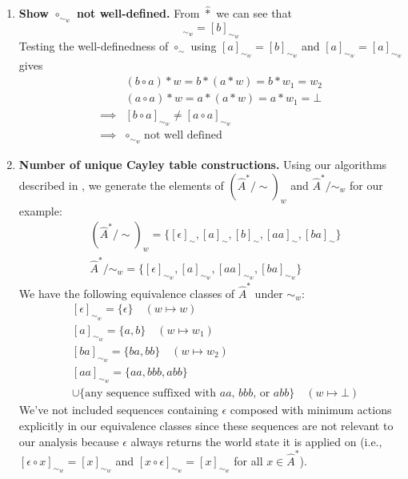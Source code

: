 \begin{proofE}
\begin{enumerate}
    \item \textbf{Show $\circ_{\sim_{w}}$ not well-defined.}
    From $\hat{\ast}$ we can see that
    \begin{equation}
        [a]_{\sim_{w}} = [b]_{\sim_{w}}
    \end{equation}
    Testing the well-definedness of $\circ_{\sim}$ using $[a]_{\sim_{w}} = [b]_{\sim_{w}}$ and $[a]_{\sim_{w}} = [a]_{\sim_{w}}$ gives
    \begin{align}
        & (b \circ a) \ast w = b \ast (a \ast w) = b \ast w_{1} = w_{2} \\
        & (a \circ a) \ast w = a \ast (a \ast w) = a \ast w_{1} = \bot \\
        \implies & [b \circ a]_{\sim_{w}} \neq [a \circ a]_{\sim_{w}} \\
        \implies & \circ_{\sim_{w}} \; \text{not well defined}
    \end{align}

    \item \textbf{Number of unique Cayley table constructions.}
    Using our algorithms described in , we generate the elements of $(\hat{A}^{*}/\sim)_{w}$ and $\hat{A}^{*}/\sim_{w}$ for our example:
    \begin{align}
        & (\hat{A}^{*}/\sim)_{w} = \{ [\epsilon]_{\sim}, [a]_{\sim}, [b]_{\sim}, [aa]_{\sim}, [ba]_{\sim} \} \\
        & \hat{A}^{*}/\sim_{w} = \{ [\epsilon]_{\sim_{w}}, [a]_{\sim_{w}}, [aa]_{\sim_{w}}, [ba]_{\sim_{w}} \}
    \end{align}
    We have the following equivalence classes of $\hat{A}^{*}$ under $\sim_{w}$:
    \begin{align}
        & [\epsilon]_{\sim_{w}} = \{ \epsilon \} \quad (w \mapsto w) \\
        & [a]_{\sim_{w}} = \{ a, b \} \quad (w \mapsto w_{1}) \\
        & [ba]_{\sim_{w}} = \{ ba, bb \} \quad (w \mapsto w_{2}) \\
        & [aa]_{\sim_{w}} = \{ aa, bbb, abb \} \\
        & \cup \{ \text{any sequence suffixed with $aa$, $bbb$, or $abb$} \} \quad (w \mapsto \bot)
    \end{align}
    We've not included sequences containing $\epsilon$ composed with minimum actions explicitly in our equivalence classes since these sequences are not relevant to our analysis because $\epsilon$ always returns the world state it is applied on (i.e., $[\epsilon \circ x]_{\sim_{w}} = [x]_{\sim_{w}}$ and $[x \circ \epsilon]_{\sim_{w}} = [x]_{\sim_{w}}$ for all $x \in \hat{A}^{*}$).


\end{enumerate}
\end{proofE}
